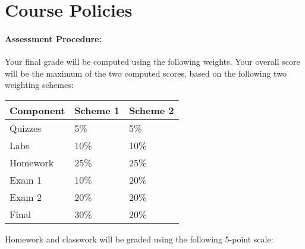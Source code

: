 \documentclass[11pt,]{article}
\begin{document}
\section{Course Policies}\label{course-policies}

\paragraph{Assessment Procedure:}\label{assessment-procedure}

Your final grade will be computed using the following weights. Your
overall score will be the maximum of the two computed scores, based on
the following two weighting schemes:

\begin{longtable}[]{@{}lll@{}}
\toprule
Component & Scheme 1 & Scheme 2\tabularnewline
\midrule
\endhead
Quizzes & 5\% & 5\%\tabularnewline
Labs & 10\% & 10\%\tabularnewline
Homework & 25\% & 25\%\tabularnewline
Exam 1 & 10\% & 20\%\tabularnewline
Exam 2 & 20\% & 20\%\tabularnewline
Final & 30\% & 20\%\tabularnewline
\bottomrule
\end{longtable}

Homework and classwork will be graded using the following 5-point scale:
\end{document}

